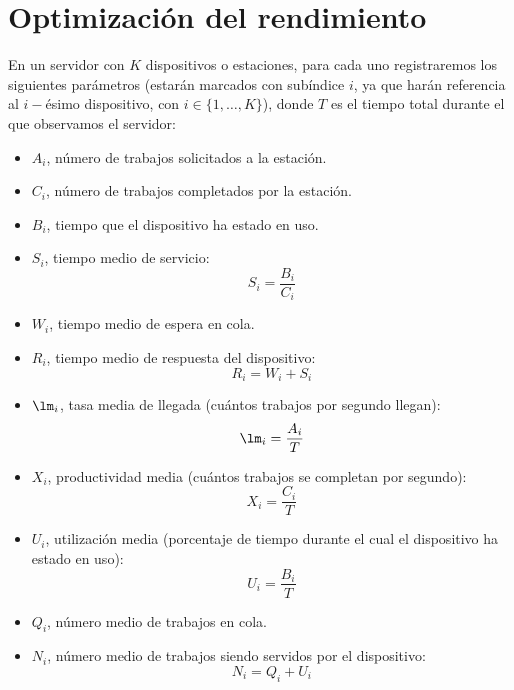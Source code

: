 \section{Optimización del rendimiento}
En un servidor con $K$ dispositivos o estaciones, para cada uno registraremos los siguientes parámetros (estarán marcados con subíndice $i$, ya que harán referencia al $i-$ésimo dispositivo, con $i \in \{1,\ldots,K\}$), donde $T$ es el tiempo total durante el que observamos el servidor:
\begin{itemize}
    \item $A_i$, número de trabajos solicitados a la estación.
    \item $C_i$, número de trabajos completados por la estación.
    \item $B_i$, tiempo que el dispositivo ha estado en uso.
    \item $S_i$, tiempo medio de servicio:
        \begin{equation*}
            S_i = \dfrac{B_i}{C_i}
        \end{equation*}
    \item $W_i$, tiempo medio de espera en cola.
    \item $R_i$, tiempo medio de respuesta del dispositivo:
        \begin{equation*}
            R_i = W_i + S_i
        \end{equation*}
    \item $\lm_i$, tasa media de llegada (cuántos trabajos por segundo llegan):
        \begin{equation*}
            \lm_i = \dfrac{A_i}{T}
        \end{equation*}
    \item $X_i$, productividad media (cuántos trabajos se completan por segundo):
        \begin{equation*}
            X_i = \dfrac{C_i}{T}
        \end{equation*}
    \item $U_i$, utilización media (porcentaje de tiempo durante el cual el dispositivo ha estado en uso):
        \begin{equation*}
            U_i = \dfrac{B_i}{T}
        \end{equation*}
    \item $Q_i$, número medio de trabajos en cola.
    \item $N_i$, número medio de trabajos siendo servidos por el dispositivo:
        \begin{equation*}
            N_i = Q_i + U_i
        \end{equation*}
\end{itemize}
